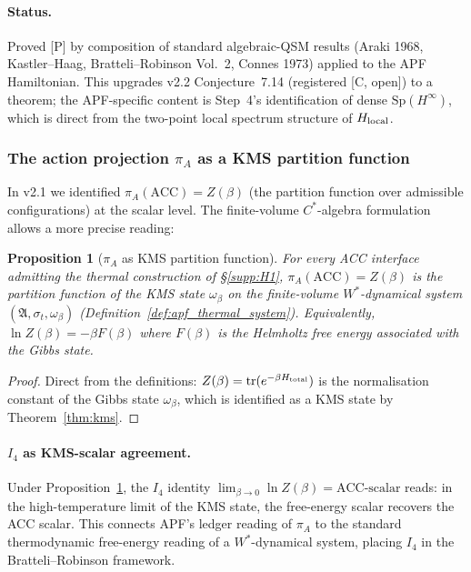 \documentclass[11pt]{article}
\theoremstyle{plain}
\newtheorem{proposition}[theorem]{Proposition}
\theoremstyle{definition}
\theoremstyle{remark}
\begin{document}
\paragraph{Status.}  Proved [P] by composition of standard algebraic-QSM results (Araki 1968, Kastler--Haag, Bratteli--Robinson Vol.~2, Connes 1973) applied to the APF Hamiltonian.  This upgrades v2.2 Conjecture~7.14 (registered [C, open]) to a theorem; the APF-specific content is Step~4's identification of dense $\mathrm{Sp}(H^\infty)$, which is direct from the two-point local spectrum structure of $H_{\rm local}$.

\bigskip

\subsubsection{The action projection $\pi_A$ as a KMS partition function}\label{supp:H53}

In v2.1 we identified $\pi_A(\mathrm{ACC}) = Z(\beta)$ (the partition function over admissible configurations) at the scalar level.  The finite-volume $C^*$-algebra formulation allows a more precise reading:

\begin{proposition}[$\pi_A$ as KMS partition function]\label{prop:piA_kms}
For every ACC interface admitting the thermal construction of \S\ref{supp:H1}, $\pi_A(\mathrm{ACC}) = Z(\beta)$ is the partition function of the KMS state $\omega_\beta$ on the finite-volume $W^*$-dynamical system $(\mathfrak{A}, \sigma_t, \omega_\beta)$ (Definition~\ref{def:apf_thermal_system}).  Equivalently, $\ln Z(\beta) = -\beta F(\beta)$ where $F(\beta)$ is the Helmholtz free energy associated with the Gibbs state.
\end{proposition}

\begin{proof}
Direct from the definitions: $Z(\beta) = \mathrm{tr}(e^{-\beta H_{\rm total}})$ is the normalisation constant of the Gibbs state $\omega_\beta$, which is identified as a KMS state by Theorem~\ref{thm:kms}.
\end{proof}

\paragraph{$I_4$ as KMS-scalar agreement.}  Under Proposition~\ref{prop:piA_kms}, the $I_4$ identity $\lim_{\beta \to 0} \ln Z(\beta) = \mathrm{ACC}\text{-scalar}$ reads: in the high-temperature limit of the KMS state, the free-energy scalar recovers the ACC scalar.  This connects APF's ledger reading of $\pi_A$ to the standard thermodynamic free-energy reading of a $W^*$-dynamical system, placing $I_4$ in the Bratteli--Robinson framework.
\end{document}
